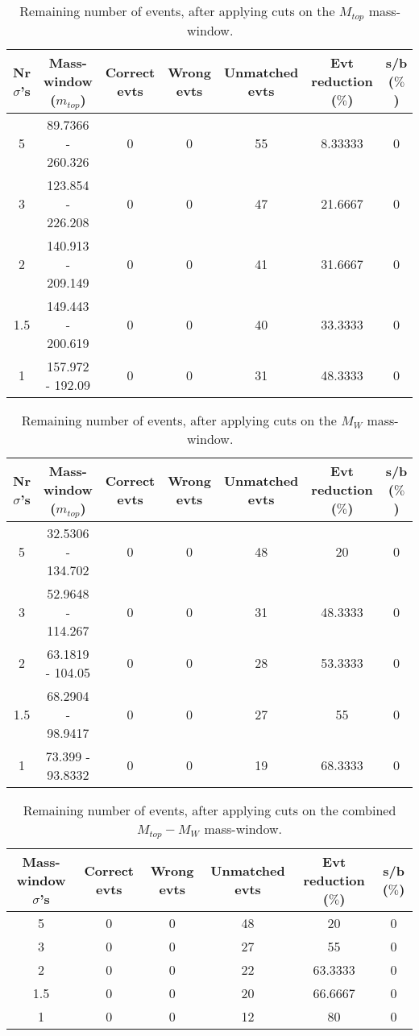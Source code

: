 \documentclass{article}
\begin{document}
 \begin{table}[h!t] 
  \caption{Remaining number of events, after applying cuts on the $M_{top}$ mass-window.} 
  \centering 
   \begin{tabular}{c|c|c|c|c|c|c}
     Nr $\sigma$'s & Mass-window ($m_{top}$)    & Correct evts    & Wrong evts     & Unmatched evts   & Evt reduction ($\%$)    & s/b ($\%$)     \\
     \hline
     5 & 89.7366 - 260.326  &   0  &  0  &  55  &  8.33333 &  0 \\ 
     3 & 123.854 - 226.208  &   0  &  0  &  47  &  21.6667 &  0 \\ 
     2 & 140.913 - 209.149  &   0  &  0  &  41  &  31.6667 &  0 \\ 
     1.5 & 149.443 - 200.619  &   0  &  0  &  40  &  33.3333 &  0 \\ 
     1 & 157.972 - 192.09  &   0  &  0  &  31  &  48.3333 &  0   \end{tabular} 
 \end{table} 
 
 \begin{table}[h!t] 
  \caption{Remaining number of events, after applying cuts on the $M_{W}$ mass-window.} 
  \centering 
   \begin{tabular}{c|c|c|c|c|c|c}
     Nr $\sigma$'s & Mass-window ($m_{top}$)    & Correct evts    & Wrong evts     & Unmatched evts   & Evt reduction ($\%$)    & s/b ($\%$)     \\
     \hline
     5 & 32.5306 - 134.702  &   0  &  0  &  48  &  20 &  0 \\ 
     3 & 52.9648 - 114.267  &   0  &  0  &  31  &  48.3333 &  0 \\ 
     2 & 63.1819 - 104.05  &   0  &  0  &  28  &  53.3333 &  0 \\ 
     1.5 & 68.2904 - 98.9417  &   0  &  0  &  27  &  55 &  0 \\ 
     1 & 73.399 - 93.8332  &   0  &  0  &  19  &  68.3333 &  0   \end{tabular} 
 \end{table} 
 
 \begin{table}[h!t] 
  \caption{Remaining number of events, after applying cuts on the combined $M_{top}-M_{W}$ mass-window.} 
  \centering 
   \begin{tabular}{c|c|c|c|c|c} 
     Mass-window $\sigma$'s & Correct evts    & Wrong evts     & Unmatched evts  & Evt reduction ($\%$)   & s/b ($\%$)     \\ 
     \hline
     5 & 0  &  0  &  48  &  20 &  0 \\ 
     3 & 0  &  0  &  27  &  55 &  0 \\ 
     2 & 0  &  0  &  22  &  63.3333 &  0 \\ 
     1.5 & 0  &  0  &  20  &  66.6667 &  0 \\ 
     1 & 0  &  0  &  12  &  80 &  0   \end{tabular} 
 \end{table} 
 
\end{document}
